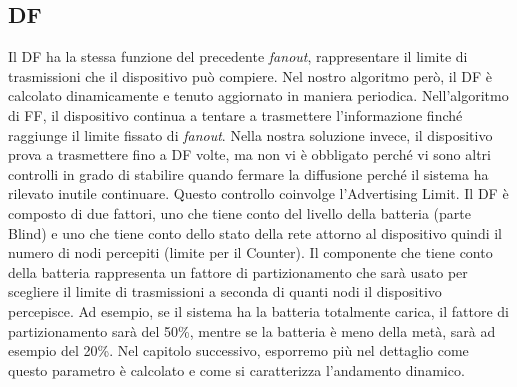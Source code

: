 \subsection{\acf{DF}}
Il \acf{DF} ha la stessa funzione del precedente \textit{fanout}, rappresentare il limite di trasmissioni che il dispositivo può compiere. Nel nostro algoritmo però, il \acs{DF} è calcolato dinamicamente e tenuto aggiornato in maniera periodica. Nell'algoritmo di \acs{FF}, il dispositivo continua a tentare a trasmettere l'informazione finché raggiunge il limite fissato di \textit{fanout}. Nella nostra soluzione invece, il dispositivo prova a trasmettere fino a \acs{DF} volte, ma non vi è obbligato perché vi sono altri controlli in grado di stabilire quando fermare la diffusione perché il sistema ha rilevato inutile continuare. Questo controllo coinvolge l'Advertising Limit. Il DF è composto di due fattori, uno che tiene conto del livello della batteria (parte Blind) e uno che tiene conto dello stato della rete attorno al dispositivo quindi il numero di nodi percepiti (limite per il Counter). Il componente che tiene conto della batteria rappresenta un fattore di partizionamento che sarà usato per scegliere il limite di trasmissioni a seconda di quanti nodi il dispositivo percepisce. Ad esempio, se il sistema ha la batteria totalmente carica, il fattore di partizionamento sarà del 50\%, mentre se la batteria è meno della metà, sarà ad esempio del 20\%. Nel capitolo successivo, esporremo più nel dettaglio come questo parametro è calcolato e come si caratterizza l'andamento dinamico.

